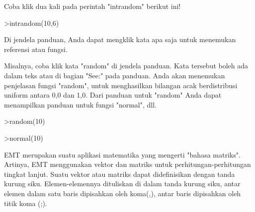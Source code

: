 \documentclass[a4paper,10pt]{article}
\begin{document}
\begin{eulernotebook}
\begin{eulercomment}
\begin{eulercomment}
\begin{eulercomment}
Coba klik dua kali pada perintah "intrandom" berikut ini!
\end{eulercomment}
\begin{eulerprompt}
>intrandom(10,6)
\end{eulerprompt}
\begin{euleroutput}
  [4,  2,  6,  2,  4,  2,  3,  2,  2,  6]
\end{euleroutput}
\begin{eulercomment}
Di jendela panduan, Anda dapat mengklik kata apa saja untuk menemukan
referensi atau fungsi.

Misalnya, coba klik kata "random" di jendela panduan. Kata tersebut
boleh ada dalam teks atau di bagian "See:" pada panduan. Anda akan
menemukan penjelasan fungsi "random", untuk menghasilkan bilangan acak
berdistribusi uniform antara 0,0 dan 1,0. Dari panduan untuk "random"
Anda dapat menampilkan panduan untuk fungsi "normal", dll.
\end{eulercomment}
\begin{eulerprompt}
>random(10)
\end{eulerprompt}
\begin{euleroutput}
  [0.270906,  0.704419,  0.217693,  0.445363,  0.308411,  0.914541,
  0.193585,  0.463387,  0.095153,  0.595017]
\end{euleroutput}
\begin{eulerprompt}
>normal(10)
\end{eulerprompt}
\begin{euleroutput}
  [-0.495418,  1.6463,  -0.390056,  -1.98151,  3.44132,  0.308178,
  -0.733427,  -0.526167,  1.10018,  0.108453]
\end{euleroutput}
\begin{eulercomment}
EMT merupakan suatu aplikasi matematika yang mengerti "bahasa matriks". Artinya,
EMT menggunakan vektor dan matriks untuk perhitungan-perhitungan tingkat lanjut.
Suatu vektor atau matriks dapat didefinisikan dengan tanda kurung siku.
Elemen-elemennya dituliskan di dalam tanda kurung siku, antar elemen dalam satu
baris dipisahkan oleh koma(,), antar baris dipisahkan oleh titik koma (;).


\end{eulercomment}
\end{eulercomment}
\end{eulercomment}
\end{eulernotebook}
\end{document}

